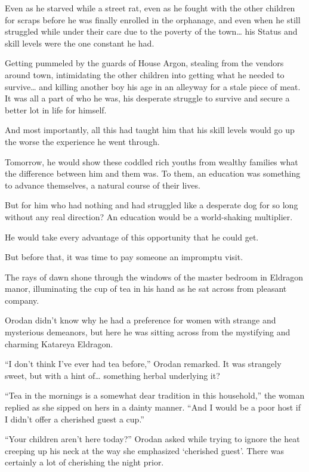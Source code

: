 \documentclass[a4paper,10pt]{book}
\begin{document}
Even as he starved while a street rat, even as he fought with the other children for scraps before he was finally enrolled in the orphanage, and even when he still struggled while under their care due to the poverty of the town… his Status and skill levels were the one constant he had.\par
Getting pummeled by the guards of House Argon, stealing from the vendors around town, intimidating the other children into getting what he needed to survive… and killing another boy his age in an alleyway for a stale piece of meat. It was all a part of who he was, his desperate struggle to survive and secure a better lot in life for himself.\par
And most importantly, all this had taught him that his skill levels would go up the worse the experience he went through.\par
Tomorrow, he would show these coddled rich youths from wealthy families what the difference between him and them was. To them, an education was something to advance themselves, a natural course of their lives.\par
But for him who had nothing and had struggled like a desperate dog for so long without any real direction? An education would be a world-shaking multiplier.\par
He would take every advantage of this opportunity that he could get.\par
But before that, it was time to pay someone an impromptu visit.\par
\par
The rays of dawn shone through the windows of the master bedroom in Eldragon manor, illuminating the cup of tea in his hand as he sat across from pleasant company.\par
Orodan didn’t know why he had a preference for women with strange and mysterious demeanors, but here he was sitting across from the mystifying and charming Katareya Eldragon.\par
“I don’t think I’ve ever had tea before,” Orodan remarked. It was strangely sweet, but with a hint of… something herbal underlying it?\par
“Tea in the mornings is a somewhat dear tradition in this household,” the woman replied as she sipped on hers in a dainty manner. “And I would be a poor host if I didn’t offer a cherished guest a cup.”\par
“Your children aren’t here today?” Orodan asked while trying to ignore the heat creeping up his neck at the way she emphasized ‘cherished guest’. There was certainly a lot of cherishing the night prior.\par
\end{document}

